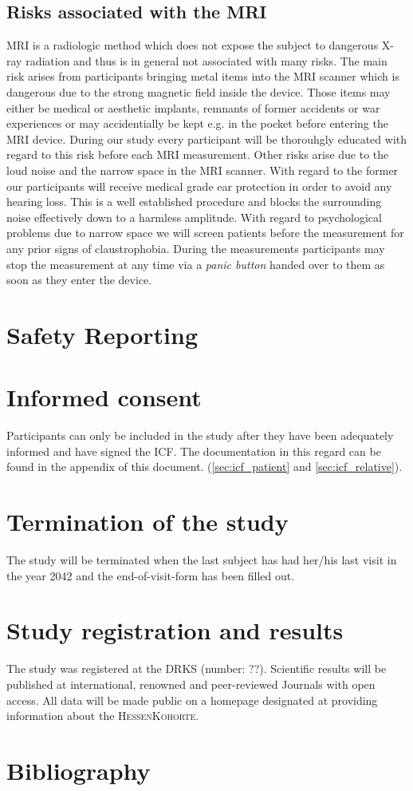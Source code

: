 
\subsection{Risks associated with the \ac{MRI}}
\ac{MRI} is a radiologic method which does not expose the subject to
dangerous X-ray radiation and thus is in general not associated with
many risks. The main risk arises from participants bringing metal
items into the \ac{MRI} scanner which is dangerous due to the strong
magnetic field inside the device. Those items may either be medical or
aesthetic implants, remnants of former accidents or war experiences or
may accidentially be kept e.g. in the pocket before entering the
\ac{MRI} device. During our study every participant will be thorouhgly
educated with regard to this risk before each \ac{MRI}
measurement. Other risks arise due to the loud noise and the narrow
space in the \ac{MRI} scanner. With regard to the former our
participants will receive medical grade ear protection in order to
avoid any hearing loss. This is a well established procedure and
blocks the surrounding noise effectively down to a harmless
amplitude. With regard to psychological problems due to narrow space
we will screen patients before the measurement for any prior signs of
claustrophobia. During the measurements participants may stop the
measurement at any time via a \emph{panic button} handed over to them
as soon as they enter the device.

\section{Safety Reporting}

\section{Informed consent}
Participants can only be included in the study after they have been adequately informed and have signed the \ac{ICF}. The documentation in this regard can be found in the appendix of this document. (\ref{sec:icf_patient} and \ref{sec:icf_relative}).

\section{Termination of the study}
The study will be terminated when the last subject has had her/his last visit in the year 2042 and the end-of-visit-form has been filled out.

\section{Study registration and results}
The study was registered at the \ac{DRKS} (number: ??). Scientific results will be published at international, renowned and peer-reviewed Journals with open access. All data will be made public on a homepage designated at providing information about the \textsc{HessenKohorte}.

\section{Bibliography}
